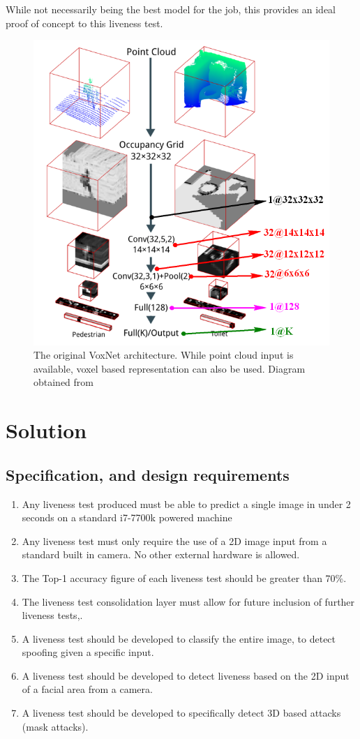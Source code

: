 \documentclass[10pt,a4paper]{article}
\begin{document}
            While not necessarily being the best model for the job, this provides an ideal proof of concept to this liveness test.
                \begin{figure}[]
                    \centering
                    \includegraphics[width=0.5\linewidth]{VoxNetArchitecture.png}
                    \caption{The original VoxNet architecture. While point cloud input is available, voxel based representation can also be used. Diagram obtained from \cite{VoxNetModel}}
                    \label{OriginalVoxNetArchitecture}
                \end{figure}


\section{Solution}
    \subsection{Specification, and design requirements}
        \begin{enumerate}
            \item \label{SpecPoint1} Any liveness test produced must be able to predict a single image in under 2 seconds on a standard i7-7700k powered machine
            \item \label{SpecPoint2} Any liveness test must only require the use of a 2D image input from a standard built in camera. No other external hardware is allowed.
            \item \label{SpecPoint3} The Top-1 accuracy figure of each liveness test should be greater than 70\%.
            \item \label{SpecPoint4} The liveness test consolidation layer must allow for future inclusion of further liveness tests,.
            \item \label{SpecPoint5} A liveness test should be developed to classify the entire image, to detect spoofing given a specific input.
            \item \label{SpecPoint6} A liveness test should be developed to detect liveness based on the 2D input of a facial area from a camera.
            \item \label{SpecPoint7} A liveness test should be developed to specifically detect 3D based attacks (mask attacks).
        \end{enumerate}
\end{document}
